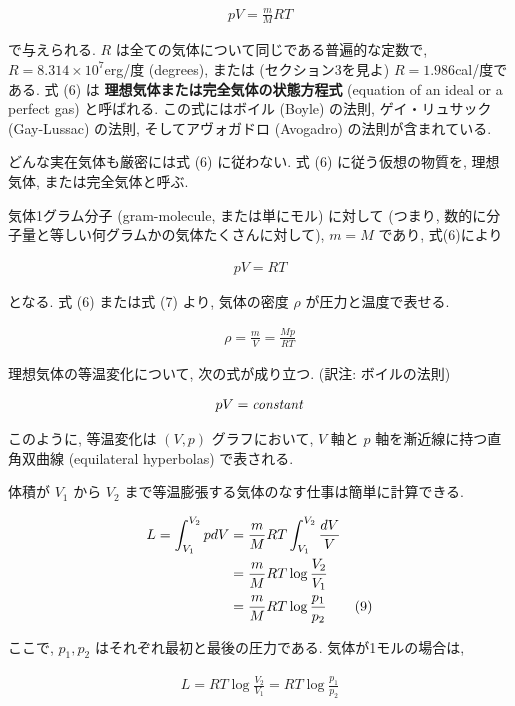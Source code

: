\begin{align}\tag{6}
pV=\frac{m}{M}RT
\end{align}

で与えられる. $R$ は全ての気体について同じである普遍的な定数で, $R=8.314\times10^7$erg/度 (degrees), または (セクション3を見よ) $R=1.986$cal/度である. 式 (6) は \textbf{理想気体または完全気体の状態方程式} (equation of an ideal or a perfect gas) と呼ばれる. この式にはボイル (Boyle) の法則, ゲイ・リュサック (Gay-Lussac) の法則, そしてアヴォガドロ (Avogadro) の法則が含まれている.\par
どんな実在気体も厳密には式 (6) に従わない. 式 (6) に従う仮想の物質を, 理想気体, または完全気体と呼ぶ.\par
気体1グラム分子 (gram-molecule, または単にモル) に対して (つまり, 数的に分子量と等しい何グラムかの気体たくさんに対して), $m=M$ であり, 式(6)により

\begin{align}\tag{7}
pV=RT
\end{align}

となる. 式 (6) または式 (7) より, 気体の密度 $\rho$ が圧力と温度で表せる. 

\begin{align}\tag{8}
\rho=\frac{m}{V}=\frac{Mp}{RT}
\end{align}\par

理想気体の等温変化について, 次の式が成り立つ. (訳注: ボイルの法則)

\begin{align*}
pV={\it constant}
\end{align*}

このように, 等温変化は $(V,p)$ グラフにおいて, $V$ 軸と $p$ 軸を漸近線に持つ直角双曲線 (equilateral hyperbolas) で表される. \par
体積が $V_{1}$ から $V_{2}$ まで等温膨張する気体のなす仕事は簡単に計算できる. 

\begin{align}
L=\int_{V_{1}}^{V_{2}}pdV &= \frac{m}{M}RT\int_{V_{1}}^{V_{2}}\frac{dV}{V}\notag\\ 
&=\frac{m}{M}RT\log\frac{V_{2}}{V_{1}}\notag\\
&=\frac{m}{M}RT\log\frac{p_{1}}{p_{2}} \tag{9}
\end{align}

ここで, $p_{1}, p_{2}$ はそれぞれ最初と最後の圧力である. 気体が1モルの場合は, 

\begin{align}\tag{10}
L=RT\log\frac{V_{2}}{V_{1}}=RT\log\frac{p_{1}}{p_{2}}
\end{align}

